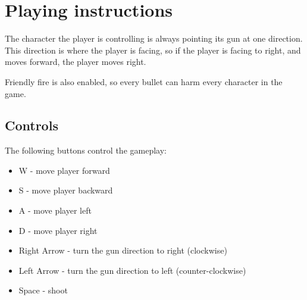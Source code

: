 \documentclass[a4paper,11pt]{article}
\begin{document}
\section*{Playing instructions}
The character the player is controlling is always pointing its gun at one direction. This direction is where the player is facing, so if the player is facing to right, and moves forward, the player moves right.

Friendly fire is also enabled, so every bullet can harm every character in the game.
\subsection*{Controls}
The following buttons control the gameplay:
\begin{itemize}
\item W - move player forward
\item S - move player backward
\item A - move player left
\item D - move player right
\item Right Arrow - turn the gun direction to right (clockwise)
\item Left Arrow - turn the gun direction to left (counter-clockwise)
\item Space - shoot
\end{itemize}
\end{document}
